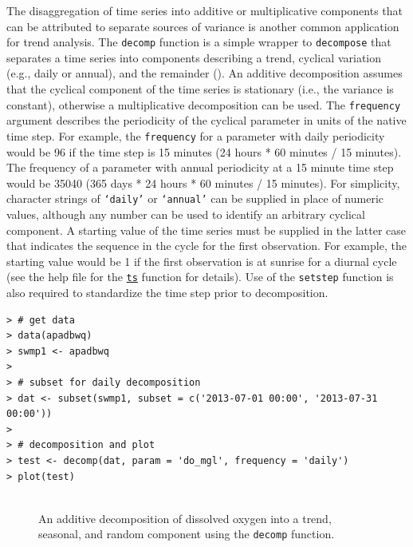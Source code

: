\documentclass[10pt,letterpaper]{article}\usepackage[]{graphicx}\usepackage[]{color}
\makeatletter
\newenvironment{kframe}{%
 \def\at@end@of@kframe{}%
 \ifinner\ifhmode%
  \def\at@end@of@kframe{\end{minipage}}%
  \begin{minipage}{\columnwidth}%
 \fi\fi%
 \def\FrameCommand##1{\hskip\@totalleftmargin \hskip-\fboxsep
 \colorbox{shadecolor}{##1}\hskip-\fboxsep
     \hskip-\linewidth \hskip-\@totalleftmargin \hskip\columnwidth}%
 \MakeFramed {\advance\hsize-\width
   \@totalleftmargin\z@ \linewidth\hsize
   \@setminipage}}%
 {\par\unskip\endMakeFramed%
 \at@end@of@kframe}
\newenvironment{knitrout}{}{} %
\makeatother
\begin{document}
The disaggregation of time series into additive or multiplicative components that can be attributed to separate sources of variance is another common application for trend analysis.  The \texttt{decomp} function is a simple wrapper to \texttt{decompose} \cite{Kendall83} that separates a time series into components describing a trend, cyclical variation (e.g., daily or annual), and the remainder  ().  An additive decomposition assumes that the cyclical component of the time series is stationary (i.e., the variance is constant), otherwise a multiplicative decomposition can be used.  The \texttt{frequency} argument describes the periodicity of the cyclical parameter in units of the native time step.  For example, the \texttt{frequency} for a parameter with daily periodicity would be 96 if the time step is 15 minutes (24 hours * 60 minutes / 15 minutes).  The frequency of a parameter with annual periodicity at a 15 minute time step would be 35040 (365 days * 24 hours * 60 minutes / 15 minutes).  For simplicity, character strings of \texttt{`daily'} or \texttt{`annual'} can be supplied in place of numeric values, although any number can be used to identify an arbitrary cyclical component.  A starting value of the time series must be supplied in the latter case that indicates the sequence in the cycle for the first observation.  For example, the starting value would be 1 if the first observation is at sunrise for a diurnal cycle (see the help file for the \href{https://stat.ethz.ch/R-manual/R-devel/library/stats/html/ts.html}{\texttt{ts}} function for details).  Use of the \texttt{setstep} function is also required to standardize the time step prior to decomposition.

\begin{knitrout}\small
{}\color{fgcolor}\begin{kframe}
\begin{verbatim}
> # get data
> data(apadbwq)
> swmp1 <- apadbwq
> 
> # subset for daily decomposition
> dat <- subset(swmp1, subset = c('2013-07-01 00:00', '2013-07-31 00:00'))
> 
> # decomposition and plot
> test <- decomp(dat, param = 'do_mgl', frequency = 'daily')
> plot(test)
\end{verbatim}
\end{kframe}\begin{figure}[!h]

{\centering \includegraphics[width=0.00\textwidth]{figure/decomp_ex1-1} 

}

\caption[An additive decomposition of dissolved oxygen into a trend, seasonal, and random component using the \texttt{decomp} function]{An additive decomposition of dissolved oxygen into a trend, seasonal, and random component using the \texttt{decomp} function.}\label{fig:decomp_ex1}
\end{figure}


\end{knitrout}
\end{document}
